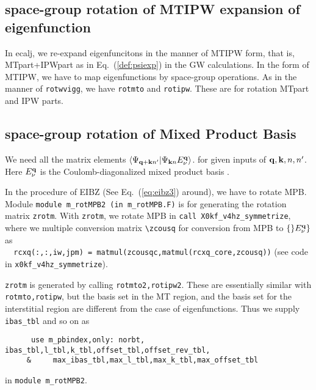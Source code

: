 \documentclass[a4paper,10pt,fleqn]{article}
\newcommand{\bfq}{{\bf q}}
\newcommand{\bfk}{{\bf k}}
\newcommand{\req}[1]{\mbox{Eq.~(\ref{#1})}}
\begin{document}
\subsection{space-group rotation of MTIPW expansion of eigenfunction}
In ecalj, we re-expand eigenfuncitons in the manner of MTIPW form, that is,
MTpart+IPWpart as in \req{def:psiexp} in the GW calculations.
In the form of MTIPW, we have to map eigenfunctions by space-group operations.
As in the manner of \verb#rotwvigg#, we have \verb#rotmto# and \verb#rotipw#.
These are for rotation MTpart and IPW parts.


\subsection{space-group rotation of Mixed Product Basis}
We need all the matrix elements $\langle \Psi_{{\bf q+k}n'}| \Psi_{{\bf k}n} E^{\bf q}_\nu \rangle$.
for given inputs of $\bfq,\bfk,n,n'$. Here $E^{\bf q}_\nu$ is the Coulomb-diagonalized mixed product basis
\cite{friedrich_efficient_2010}.

In the procedure of EIBZ (See \req{eq:eibz3} around), we have to rotate MPB.\\
Module \verb#module m_rotMPB2 (in m_rotMPB.F)# is for generating the rotation matrix \verb#zrotm#.
With \verb#zrotm#, we rotate MPB in \verb#call X0kf_v4hz_symmetrize#, where
we multiple conversion matrix \verb#\zcousq# for conversion from MPB to $\{\}E^{\bf q}_\nu\}$ as\\
\verb#  rcxq(:,:,iw,jpm) = matmul(zcousqc,matmul(rcxq_core,zcousq))# (see code in \verb#x0kf_v4hz_symmetrize#).

{\tt zrotm} is generated by calling \verb#rotmto2,rotipw2#. 
These are essentially similar with \verb#rotmto,rotipw#, but the basis set in the MT region,
and the basis set for the interstitial region are different from the case of eigenfunctions.
Thus we supply  \verb#ibas_tbl# and so on as
\begin{verbatim}
      use m_pbindex,only: norbt, ibas_tbl,l_tbl,k_tbl,offset_tbl,offset_rev_tbl,
     &     max_ibas_tbl,max_l_tbl,max_k_tbl,max_offset_tbl
\end{verbatim}
in \verb#module m_rotMPB2#.


\end{document}
